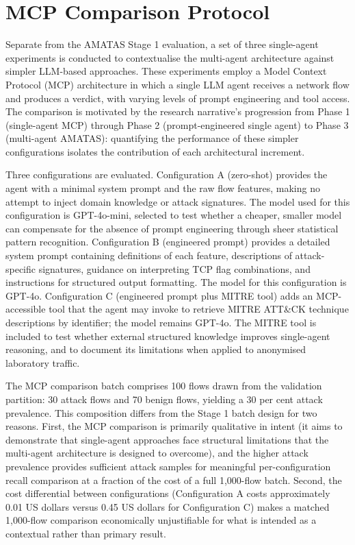 \section{MCP Comparison Protocol}
\label{sec:mcp-comparison-protocol}

Separate from the AMATAS Stage 1 evaluation, a set of three single-agent experiments is conducted to contextualise the multi-agent architecture against simpler LLM-based approaches. These experiments employ a Model Context Protocol (MCP) architecture in which a single LLM agent receives a network flow and produces a verdict, with varying levels of prompt engineering and tool access. The comparison is motivated by the research narrative's progression from Phase 1 (single-agent MCP) through Phase 2 (prompt-engineered single agent) to Phase 3 (multi-agent AMATAS): quantifying the performance of these simpler configurations isolates the contribution of each architectural increment.

Three configurations are evaluated. Configuration A (zero-shot) provides the agent with a minimal system prompt and the raw flow features, making no attempt to inject domain knowledge or attack signatures. The model used for this configuration is GPT-4o-mini, selected to test whether a cheaper, smaller model can compensate for the absence of prompt engineering through sheer statistical pattern recognition. Configuration B (engineered prompt) provides a detailed system prompt containing definitions of each feature, descriptions of attack-specific signatures, guidance on interpreting TCP flag combinations, and instructions for structured output formatting. The model for this configuration is GPT-4o. Configuration C (engineered prompt plus MITRE tool) adds an MCP-accessible tool that the agent may invoke to retrieve MITRE ATT\&CK technique descriptions by identifier; the model remains GPT-4o. The MITRE tool is included to test whether external structured knowledge improves single-agent reasoning, and to document its limitations when applied to anonymised laboratory traffic.

The MCP comparison batch comprises 100 flows drawn from the validation partition: 30 attack flows and 70 benign flows, yielding a 30 per cent attack prevalence. This composition differs from the Stage 1 batch design for two reasons. First, the MCP comparison is primarily qualitative in intent (it aims to demonstrate that single-agent approaches face structural limitations that the multi-agent architecture is designed to overcome), and the higher attack prevalence provides sufficient attack samples for meaningful per-configuration recall comparison at a fraction of the cost of a full 1,000-flow batch. Second, the cost differential between configurations (Configuration A costs approximately 0.01 US dollars versus 0.45 US dollars for Configuration C) makes a matched 1,000-flow comparison economically unjustifiable for what is intended as a contextual rather than primary result.

